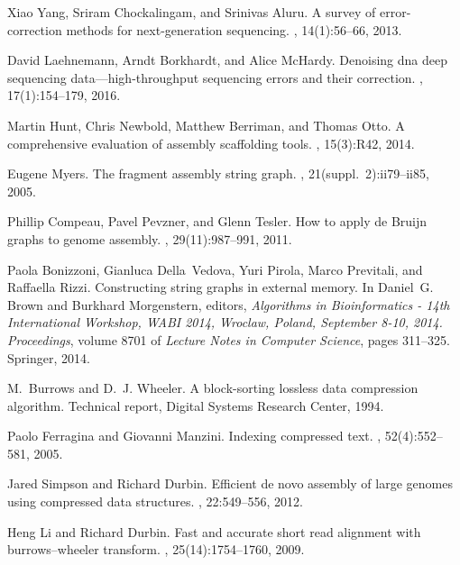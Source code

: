 \documentclass[11pt,oneside,a4paper]{article}
\begin{document}
%
%

\begin{thebibliography}{10}

Xiao Yang, Sriram Chockalingam, and Srinivas Aluru.
\newblock A survey of error-correction methods for next-generation sequencing.
, 14(1):56--66, 2013.

David Laehnemann, Arndt Borkhardt, and Alice McHardy.
\newblock Denoising dna deep sequencing data—high-throughput sequencing
  errors and their correction.
, 17(1):154--179, 2016.

Martin Hunt, Chris Newbold, Matthew Berriman, and Thomas Otto.
\newblock A comprehensive evaluation of assembly scaffolding tools.
, 15(3):R42, 2014.

Eugene Myers.
\newblock The fragment assembly string graph.
, 21(suppl.~2):ii79--ii85, 2005.

Phillip Compeau, Pavel Pevzner, and Glenn Tesler.
\newblock How to apply de {Bruijn} graphs to genome assembly.
, 29(11):987--991, 2011.

Paola Bonizzoni, Gianluca Della~Vedova, Yuri Pirola, Marco Previtali, and
  Raffaella Rizzi.
\newblock Constructing string graphs in external memory.
\newblock In Daniel~G. Brown and Burkhard Morgenstern, editors, {\em Algorithms
  in Bioinformatics - 14th International Workshop, {WABI} 2014, Wroclaw,
  Poland, September 8-10, 2014. Proceedings}, volume 8701 of {\em Lecture Notes
  in Computer Science}, pages 311--325. Springer, 2014.

M.~Burrows and D.~J. Wheeler.
\newblock A block-sorting lossless data compression algorithm.
\newblock Technical report, Digital Systems Research Center, 1994.

Paolo Ferragina and Giovanni Manzini.
\newblock Indexing compressed text.
, 52(4):552--581, 2005.

Jared Simpson and Richard Durbin.
\newblock Efficient de novo assembly of large genomes using compressed data
  structures.
, 22:549--556, 2012.

Heng Li and Richard Durbin.
\newblock Fast and accurate short read alignment with burrows–wheeler
  transform.
, 25(14):1754--1760, 2009.


\end{thebibliography}
\end{document}
